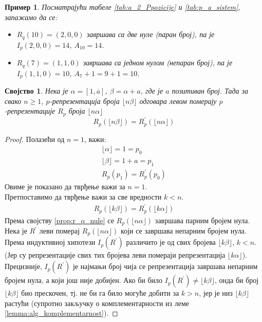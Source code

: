 \documentclass[a4paper]{article}
\newtheorem{example}{Пример}
\newtheorem{property}{Својство}
\begin{document}
\begin{example}
	Посматрајући табеле \ref{tab:a_2_Ppozicije} и \ref{tab:p_q_sistem}, запажамо да се:
	\begin{itemize}
		\item $ R_q(10) = (2, 0, 0) $ завршава са две нуле (паран број), па је $ I_{p}(2, 0, 0) = 14 $, $ A_{10} = 14 $.
		\item $ R_q(7) = (1, 1, 0) $ завршава са једном нулом (непаран број), па је $ I_{p}(1, 1, 0) = 10 $, $ A_{7} + 1 = 9 + 1 = 10  $.
	\end{itemize}
\end{example}

\begin{property}
	\label{prop:levi_pomeraj}
	Нека је $ \alpha = [1,\overline{a}] $, $ \beta = \alpha + a $, где је $ a $ позитиван број. Тада за свако $ n \geq 1 $, $ p $-репрезентација броја $ \lfloor n \beta \rfloor $ одговара левом померају $ p $-репрезентације $ 
	R_{p} $ броја  $ \lfloor n \alpha \rfloor $	
		\begin{displaymath}
			R_{p} (\lfloor n \beta \rfloor) = R_{p}^{'} (\lfloor n \alpha \rfloor) 
		\end{displaymath}
\end{property}

\begin{proof}
	Полазећи од $ n = 1 $, важи:
		\begin{eqnarray*}
			\lfloor \alpha \rfloor = 1 = p_{0}\\
			\lfloor \beta \rfloor = 1 + a = p_{1}\\
			R_{p}(p_{1}) = R_{p}^{'}(p_{0})
		\end{eqnarray*}
	Овиме је показано да тврђење важи за $ n = 1 $.\\	
	Претпоставимо да тврђење важи за све вредности $ k < n $.	
		\begin{eqnarray*}
			R_{p}(\lfloor k\beta \rfloor) = R_{p}^{'}(\lfloor k\alpha \rfloor)
		\end{eqnarray*}	
	Према својству \ref{prop:r_q_nule} се $ R_{p}(\lfloor n\alpha \rfloor) $ завршава парним бројем нула. Нека је $ R^{'} $ леви померај $ R_{p}(\lfloor n\alpha \rfloor) $ који се завршава непарним бројем нула. Према индуктивној хипотези $ I_{p}(R^{'}) $ различито је од свих бројева $ \lfloor k\beta \rfloor $, $ k < n $. (Јер су репрезентације свих тих бројева леви помераји репрезентација $ \lfloor k\alpha \rfloor $). Прецизније, $ I_{p}(R^{'}) $ је најмањи број чија се репрезентација завршава непарним бројем нула, а који још није добијен. Ако би било $ I_{p}(R^{'}) \neq \lfloor k\beta \rfloor $, онда би број $ \lfloor k\beta \rfloor $ био прескочен, тј. не би га било могуће добити за $ k > n $, јер је низ $ \lfloor k\beta \rfloor $ растући (супротно закључку о комплементарности из леме \ref{lemma:alg_komplementarnost}).
\end{proof}
\end{document}
